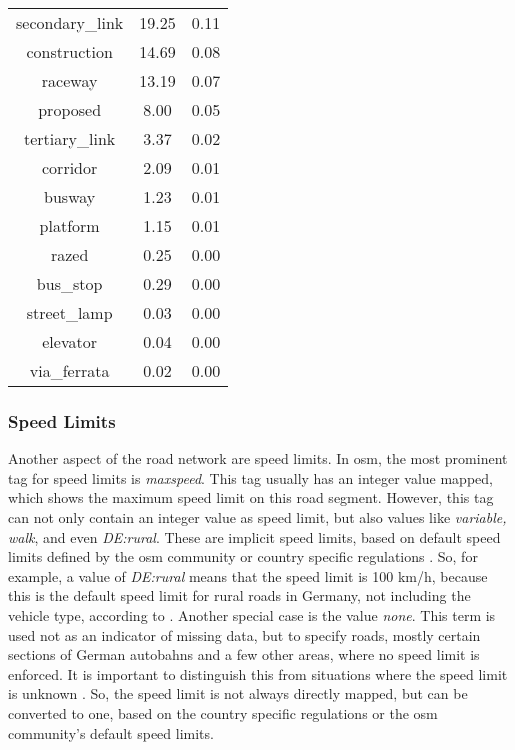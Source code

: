 \begin{table}[htb]
\begin{minipage}{.495\textwidth}
\begin{tabular}{ccc}
            secondary\_link & 19.25 & 0.11 \\
            construction & 14.69 & 0.08 \\
            raceway & 13.19 & 0.07 \\
            proposed & 8.00 & 0.05 \\
            tertiary\_link & 3.37 & 0.02 \\
            corridor & 2.09 & 0.01 \\
            busway & 1.23 & 0.01 \\
            platform & 1.15 & 0.01 \\
            razed & 0.25 & 0.00 \\
            bus\_stop & 0.29 & 0.00 \\
            street\_lamp & 0.03 & 0.00 \\
            elevator & 0.04 & 0.00 \\
            via\_ferrata & 0.02 & 0.00 \\
            \bottomrule
        \end{tabular}
    \end{minipage}
    \label{tab:roadlengths}    
\end{table}

\subsubsection*{Speed Limits}
\label{subsec:speedlimits}

Another aspect of the road network are speed limits. In \gls{osm}, the most prominent tag for speed limits is \emph{maxspeed}. This tag usually has an integer value mapped, which shows the maximum speed limit on this road segment. However, this tag can not only contain an integer value as speed limit, but also values like \emph{variable, walk}, and even \emph{DE:rural}. These are implicit speed limits, based on default speed limits defined by the \gls{osm} community or country specific regulations \autocite{OSMWiki2024f}. So, for example, a value of \emph{DE:rural} means that the speed limit is 100 km/h, because this is the default speed limit for rural roads in Germany, not including the vehicle type, according to \textcite{OSMWiki2024f}. Another special case is the value \emph{none}. This term is used not as an indicator of missing data, but to specify roads, mostly certain sections of German autobahns and a few other areas, where no speed limit is enforced. It is important to distinguish this from situations where the speed limit is unknown \autocite{OSMWiki2024a}. So, the speed limit is not always directly mapped, but can be converted to one, based on the country specific regulations or the \gls{osm} community's default speed limits.

